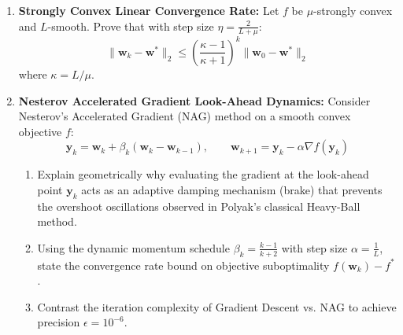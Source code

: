 \begin{enumerate}[label=\textbf{P\arabic*.}]
    \item \textbf{Strongly Convex Linear Convergence Rate:}
    Let $f$ be $\mu$-strongly convex and $L$-smooth. Prove that with step size $\eta = \frac{2}{L + \mu}$:
    \begin{equation}
    \|\mathbf{w}_k - \mathbf{w}^*\|_2 \le \left( \frac{\kappa - 1}{\kappa + 1} \right)^k \|\mathbf{w}_0 - \mathbf{w}^*\|_2
    \end{equation}
    where $\kappa = L / \mu$.

    \item \textbf{Nesterov Accelerated Gradient Look-Ahead Dynamics:}
    Consider Nesterov's Accelerated Gradient (NAG) method on a smooth convex objective $f$:
    \begin{equation}
    \mathbf{y}_k = \mathbf{w}_k + \beta_k (\mathbf{w}_k - \mathbf{w}_{k-1}), \qquad \mathbf{w}_{k+1} = \mathbf{y}_k - \alpha \nabla f(\mathbf{y}_k)
    \end{equation}
    \begin{enumerate}[label=(\alph*)]
        \item Explain geometrically why evaluating the gradient at the look-ahead point $\mathbf{y}_k$ acts as an adaptive damping mechanism (brake) that prevents the overshoot oscillations observed in Polyak's classical Heavy-Ball method.
        \item Using the dynamic momentum schedule $\beta_k = \frac{k-1}{k+2}$ with step size $\alpha = \frac{1}{L}$, state the convergence rate bound on objective suboptimality $f(\mathbf{w}_k) - f^*$.
        \item Contrast the iteration complexity of Gradient Descent vs. NAG to achieve precision $\epsilon = 10^{-6}$.
    \end{enumerate}


\end{enumerate}
